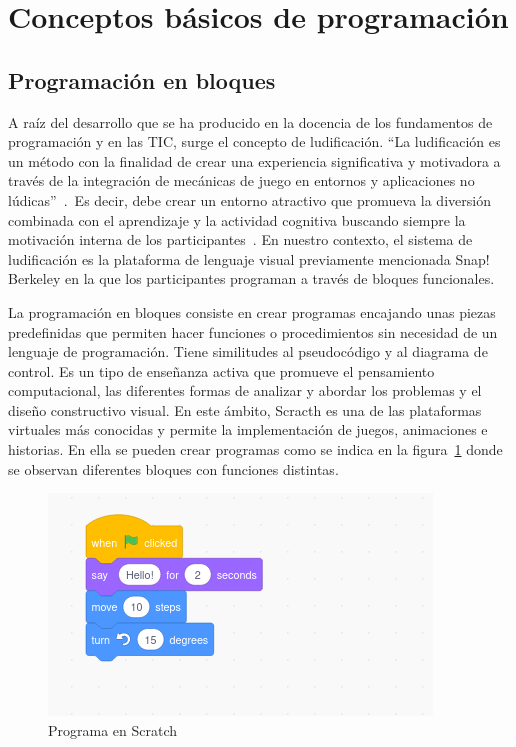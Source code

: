 \documentclass[a4paper, 12pt]{book}
\begin{document}
\section{Conceptos básicos de programación}

\subsection{Programación en bloques}
A raíz del desarrollo que se ha producido en la docencia de los fundamentos de programación y en las TIC, surge el concepto de ludificación. ``La ludificación es un método con la finalidad de crear una experiencia  significativa y motivadora a través de la integración de mecánicas de juego en entornos y aplicaciones no lúdicas''~\cite{lopez2017pensamiento}.~Es decir, debe crear un entorno atractivo que promueva la diversión combinada con el aprendizaje y la actividad cognitiva  buscando siempre la motivación interna de los participantes~\cite{vsimko2014ludificacion}. En nuestro contexto, el sistema de ludificación es la plataforma de lenguaje visual previamente mencionada Snap! Berkeley en la que los participantes programan a través de bloques funcionales.

La programación en bloques consiste en crear programas encajando unas piezas  predefinidas que permiten hacer funciones o procedimientos sin necesidad de un lenguaje de programación. Tiene similitudes al pseudocódigo y al diagrama de control. Es un tipo de enseñanza activa que promueve el pensamiento computacional, las diferentes formas de analizar y abordar los problemas y el diseño constructivo visual.
En este ámbito, Scracth es una de las plataformas virtuales más conocidas y permite la implementación de juegos, animaciones e historias. En ella se pueden crear programas como se indica en la figura~\ref{figura:scratch} donde se observan diferentes bloques con funciones distintas.
\begin{figure}[h]
        \centering
        \includegraphics[scale=0.55]{img/scratch.png}
        \caption{Programa en Scratch}
        \label{figura:scratch}
\end{figure}
\end{document}
